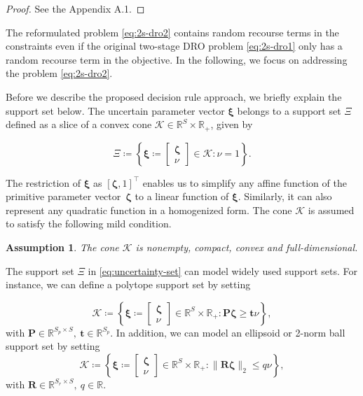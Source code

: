 \documentclass{article}
\newcommand{\RR}{\mathbb{R}}
\newtheorem{assume}{Assumption}
\begin{document}
\begin{proof}
See the Appendix A.1.
\end{proof}
\noindent The reformulated problem \eqref{eq:2s-dro2} contains random recourse terms in the constraints even if the original two-stage DRO problem \eqref{eq:2s-dro1} only has a random recourse term in the objective. In the following, we focus on addressing the problem \eqref{eq:2s-dro2}. 

Before we describe the proposed decision rule approach, we briefly explain the support set below. The uncertain parameter vector $\bm \xi$ belongs to a support set $\Xi$ defined as a slice of a convex cone $\mathcal{K} \in \RR^{S}\times \RR_{+} $, given by

\begin{equation}
\label{eq:uncertainty-set}
    \Xi \coloneqq \left\{\bm \xi \coloneqq \begin{bmatrix}\bm \zeta\\ \nu \end{bmatrix} \in \mathcal{K}:
    \nu = 1
     \right\}.
\end{equation}

\noindent The restriction of $\bm \xi$ as $[\bm \zeta, 1]^\top$ enables us to simplify any affine function of the primitive parameter vector~$\bm \zeta$ to a linear function of $\bm \xi$. Similarly, it can also represent any quadratic function in a homogenized form. 
 The cone $\mathcal{K}$ is assumed to satisfy the following mild condition.
\begin{assume}\label{assum1}
The cone $\mathcal{K}$ is nonempty, compact, convex and full-dimensional.
\end{assume}
\noindent The support set $\Xi$ in \eqref{eq:uncertainty-set} can model widely used support sets. For instance, we can define a polytope support set by setting 

$$\mathcal{K} \coloneqq \left \{\bm \xi \coloneqq \begin{bmatrix}\bm \zeta\\ \nu \end{bmatrix} \in \RR^{S} \times \RR_+: \bm P \bm \zeta \geq \bm t \nu \right \},$$ with $\bm P \in \RR^{S_p \times S}, \ \bm t \in \RR^{S_p}$. In addition, we can model an ellipsoid or 2-norm ball support set by setting 
$$ \mathcal{K} \coloneqq \left \{\bm \xi \coloneqq \begin{bmatrix} \bm \zeta\\ \nu \end{bmatrix} \in \RR^{S} \times \RR_+: \| \mathbf{R} \bm \zeta \|_2 \leq q \nu \right \},$$
with $\bm R \in \RR^{S_r \times S},\ q \in \RR$.
\end{document}
